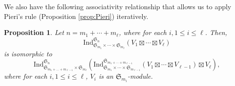 \documentclass{amsart}
\newtheorem{proposition}{Proposition}
\theoremstyle{definition}
\theoremstyle{remark}
\numberwithin{equation}{section}
\begin{document}
We also have the following associativity relationship that allows us to apply Pieri's rule (Proposition \ref{prop:Pieri})
iteratively.

\begin{proposition}
\label{prop:associative}
Let $n = m_1+\cdots+m_\ell$, where for each $i, 1\leq i \leq \ell$. Then,
\[
{\mathrm{Ind}}_{\mathfrak{S}_{m_1} \times\cdots \times \mathfrak{S}_{m_\ell}}^{\mathfrak{S}_{n}} 
(V_1 \boxtimes \cdots \boxtimes V_\ell)
\]
is isomorphic to 
\[
{\mathrm{Ind}}_{\mathfrak{S}_{m_1+\ldots+m_{\ell-1}} \times \mathfrak{S}_{m_\ell}}^{\mathfrak{S}_n}
({\mathrm{Ind}}_{\mathfrak{S}_{m_1} \times \cdots \times \mathfrak{S}_{m_{\ell-1}}}^{\mathfrak{S}_{m_1+\cdots+m_{\ell-1}}}
(V_1 \boxtimes \cdots \boxtimes V_{\ell-1}) \boxtimes V_\ell),
\]
where for each $i, 1\leq i \leq \ell$, $V_i$ is an $\mathfrak{S}_{m_i}$-module.
\end{proposition}
 
\end{document}
